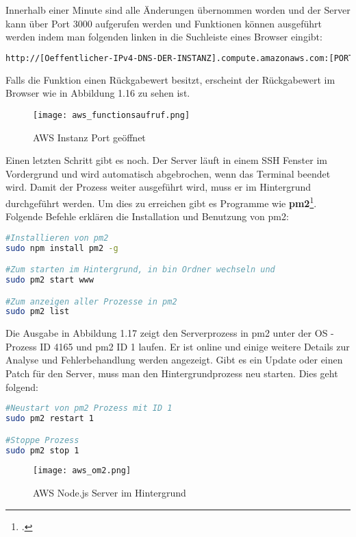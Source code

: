 Innerhalb einer Minute sind alle Änderungen übernommen worden und der Server kann über Port 3000 aufgerufen werden und Funktionen können ausgeführt werden indem man folgenden linken
in die Suchleiste eines Browser eingibt:
\begin{lstlisting}[language=bash]
http://[Oeffentlicher-IPv4-DNS-DER-INSTANZ].compute.amazonaws.com:[PORTNUMMER]/[FUNKTIONS_NAME]
\end{lstlisting}
Falls die Funktion einen Rückgabewert besitzt, erscheint der Rückgabewert im Browser wie in Abbildung 1.16 zu sehen ist.
\begin{center}
\begin{figure}[H]
    \centering
    \texttt{[image: aws\_functionsaufruf.png]}
    \caption{AWS Instanz Port geöffnet}
\end{figure}
\end{center}
Einen letzten Schritt gibt es noch.
Der Server läuft in einem SSH Fenster im Vordergrund und wird automatisch abgebrochen, wenn das Terminal beendet wird.
Damit der Prozess weiter ausgeführt wird, muss er im Hintergrund durchgeführt werden. Um dies zu erreichen gibt es Programme
wie \textbf{pm2}\footcite{pm2}. Folgende Befehle erklären die Installation und Benutzung von pm2:
\begin{lstlisting}[language=bash]
#Installieren von pm2
sudo npm install pm2 -g

#Zum starten im Hintergrund, in bin Ordner wechseln und
sudo pm2 start www

#Zum anzeigen aller Prozesse in pm2
sudo pm2 list
\end{lstlisting}
Die Ausgabe in Abbildung 1.17 zeigt den Serverprozess in pm2 unter der OS - Prozess ID 4165 und pm2 ID 1 laufen. Er ist online und einige weitere Details zur Analyse und Fehlerbehandlung werden angezeigt.
Gibt es ein Update oder einen Patch für den Server, muss man den Hintergrundprozess neu starten. Dies geht folgend:
\begin{lstlisting}[language=bash]
#Neustart von pm2 Prozess mit ID 1
sudo pm2 restart 1

#Stoppe Prozess
sudo pm2 stop 1
\end{lstlisting}
\begin{center}
\begin{figure}[H]
    \centering
    \texttt{[image: aws\_om2.png]}
    \caption{AWS Node.js Server im Hintergrund}
\end{figure}
\end{center}
\newpage